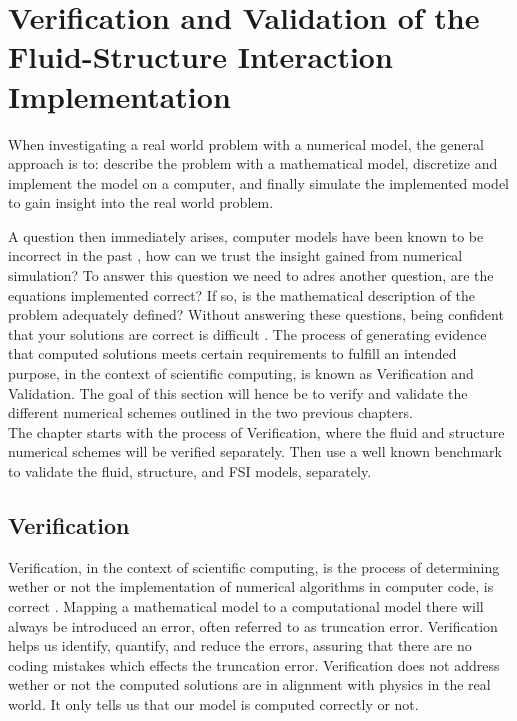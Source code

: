 \chapter{Verification and Validation of the Fluid-Structure Interaction Implementation}\label{chap:VV}
When investigating a real world problem with a numerical model, the general approach is to: describe the problem with a mathematical model, discretize and implement the model on a computer, and finally simulate the implemented model to gain insight into the real world problem.

A question then immediately arises, computer models have been known to be incorrect in the past \cite{oberkampf2008verification}, how can we trust the insight gained from numerical simulation? 
To answer this question we need to adres another question, are the equations implemented correct? If so, is the mathematical description of the problem adequately defined? 
Without answering these questions, being confident that your solutions are correct is difficult \cite{oberkampf2008verification}. The process of generating evidence that computed solutions meets certain requirements to fulfill an intended purpose, in the context of scientific computing, is known as Verification and Validation. The goal of this section will hence be to verify and validate the different numerical schemes outlined in the two previous chapters.  \\

The chapter starts with the process of Verification, where the fluid and structure numerical schemes will be verified separately. Then use a well known benchmark to validate the fluid, structure, and FSI models, separately. \newline

\section{Verification}
Verification, in the context of scientific computing, is the process of determining wether or not the implementation of numerical algorithms in computer code, is correct \cite{Oberkampf2010}.
Mapping a mathematical model to a computational model there will always be introduced an error, often referred to as truncation error. Verification helps us identify, quantify, and reduce the errors, assuring that there are no coding mistakes which effects the truncation error. Verification does not address wether or not the computed solutions are in alignment with physics in the real world. It only tells us that our model is computed correctly or not. \newline

